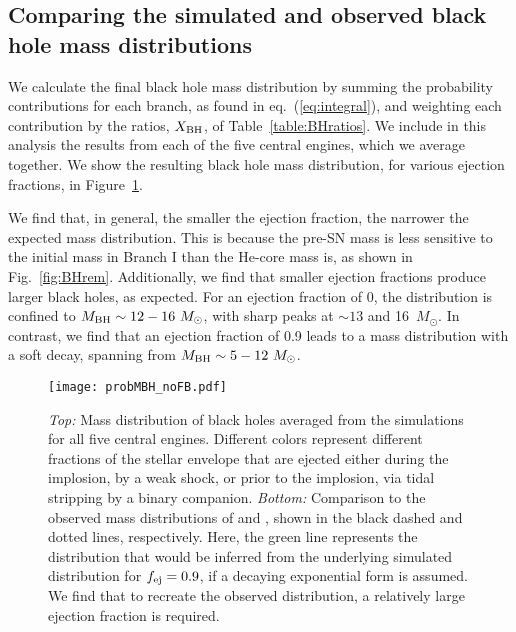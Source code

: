 \documentclass[]{emulateapj}
\newcommand{\Ms}{M_{\odot}}
\newcommand{\Mb}{M_{\rm BH}}
\newcommand{\fe}{f_{\rm ej}}
\begin{document}
\subsection{Comparing the simulated and observed black hole mass distributions}
We calculate the final black hole mass distribution by summing the probability contributions for each branch, as found in eq.~(\ref{eq:integral}), and weighting each contribution by the ratios, $X_{\rm BH}$, of Table~\ref{table:BHratios}. We include in this analysis the results from each of the five central engines, which we average together. We show the resulting black hole mass distribution, for various ejection fractions, in Figure~\ref{fig:PBH}.

We find that, in general, the smaller the ejection fraction, the narrower the expected mass distribution. This is because the pre-SN mass is less sensitive to the initial mass in Branch I than the He-core mass is, as shown in Fig.~\ref{fig:BHrem}. Additionally, we find that smaller ejection fractions produce larger black holes, as expected.  For an ejection fraction of 0, the distribution is confined to $\Mb\sim12-16~\Ms$, with sharp peaks at $\sim 13$ and 16~$\Ms$. In contrast, we find that an ejection fraction of 0.9 leads to a mass distribution with a soft decay, spanning from $\Mb \sim5-12~\Ms$. 

\begin{figure}[ht]
\centering
\texttt{[image: probMBH\_noFB.pdf]}
\caption{\label{fig:PBH} \textit{Top: }Mass distribution of black holes averaged from the simulations for all five central engines. Different colors represent different fractions of the stellar envelope that are ejected either during the implosion, by a weak shock, or prior to the implosion, via tidal stripping by a binary companion. \textit{Bottom: } Comparison to the observed mass distributions of \citet{Farr2011} and \citet{Ozel2012}, shown in the black dashed and dotted lines, respectively. Here, the green line represents the distribution that would be inferred from the underlying simulated distribution for $\fe=0.9$, if a decaying exponential form is assumed. We find that to recreate the observed distribution, a relatively large ejection fraction is required.}
\end{figure}
\end{document}

